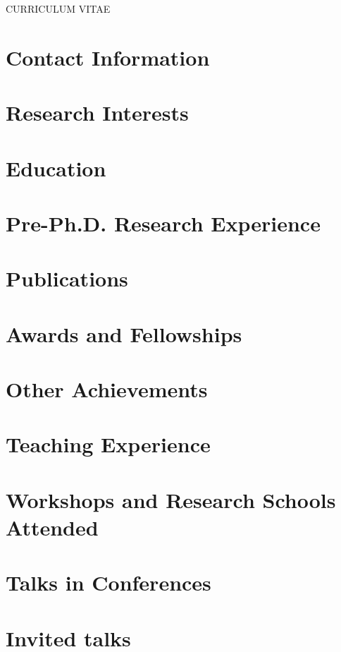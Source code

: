 \documentclass[margin,line]{res}
\begin{document}
\centerline{\Large CURRICULUM VITAE}


\begin{resume}
\section{\sc Contact Information}
    
\section{\sc Research Interests}
    
\section{\sc Education}
    
\section{\sc Pre-Ph.D. Research Experience}
    
\section{\sc Publications}
    
\section{\sc Awards and Fellowships}
    
\section{\sc Other Achievements}
    
\section{\sc Teaching Experience}
    
\section{\sc Workshops and Research Schools Attended}
    
\section{\sc Talks in Conferences}
    
\section{\sc Invited talks}
    

\end{resume}
\end{document}
